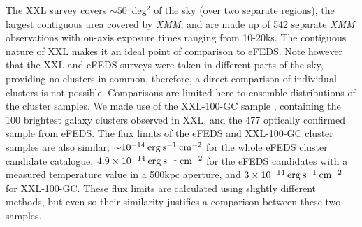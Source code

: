 \documentclass[fleqn,usenatbib]{mnras}
\begin{document}
The XXL survey \citep{xxlfoundation} covers ${\sim}50$~deg$^2$ of the sky (over two separate regions), the largest contiguous area covered by {\em XMM}, and are made up of 542 separate {\em XMM} observations with on-axis exposure times ranging from 10-20ks.  The contiguous nature of XXL makes it an ideal point of comparison to eFEDS.  Note however that the XXL and eFEDS surveys were taken in different parts of the sky, providing no clusters in common, therefore, a direct comparison of individual clusters is not possible.  Comparisons are limited here to ensemble distributions of the cluster samples.  We made use of the XXL-100-GC sample \citep{xxlgc100}, containing the 100 brightest galaxy clusters observed in XXL, and the 477 optically confirmed sample from eFEDS.  The flux limits of the eFEDS and XXL-100-GC cluster samples are also similar; ${\sim}10^{-14}\:\rm{erg}\:\rm{s}^{-1}\:\rm{cm}^{-2}$ for the whole eFEDS cluster candidate catalogue, $4.9\times10^{-14}\:\rm{erg}\:\rm{s}^{-1}\:\rm{cm}^{-2}$ for the eFEDS candidates with a measured temperature value in a 500kpc aperture, and $3\times10^{-14}\:\rm{erg}\:\rm{s}^{-1}\:\rm{cm}^{-2}$ for XXL-100-GC. These flux limits are calculated using slightly different methods, but even so their similarity justifies a comparison between these two samples.

\end{document}
